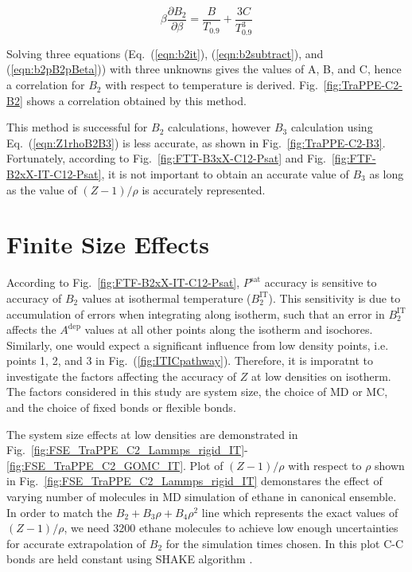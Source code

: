 \documentclass[5p,times]{elsarticle}
\begin{document}
\begin{equation}
\beta \frac{\partial B_2}{\partial \beta}=\frac{B}{T_{0.9}}+\frac{3C}{T_{0.9}^3} \label{eqn:b2pB2pBeta}
\end{equation}

Solving three equations (Eq.~(\ref{eqn:b2it}), (\ref{eqn:b2subtract}), and (\ref{eqn:b2pB2pBeta})) with three unknowns gives the values of A, B, and C, hence a correlation for $B_2$ with respect to temperature is derived. Fig.~\ref{fig:TraPPE-C2-B2} shows a correlation obtained by this method. 

This method is successful for $B_2$ calculations, however $B_3$ calculation using Eq.~(\ref{eqn:Z1rhoB2B3}) is less accurate, as shown in Fig.~\ref{fig:TraPPE-C2-B3}. Fortunately, according to Fig.~\ref{fig:FTT-B3xX-C12-Psat} and Fig.~\ref{fig:FTF-B2xX-IT-C12-Psat}, it is not important to obtain an accurate value of $B_3$ as long as the value of $(Z-1)/\rho$ is accurately represented.

\section{Finite Size Effects}\label{sec:FSE}
According to Fig.~\ref{fig:FTF-B2xX-IT-C12-Psat}, $P^{\mathrm{sat}}$ accuracy is sensitive to accuracy of $B_2$ values at isothermal temperature ($B_2^{\mathrm{IT}}$). This sensitivity is due to accumulation of errors when integrating along isotherm, such that an error in $B_2^{\mathrm{IT}}$ affects the $A^{\mathrm{dep}}$ values at all other points along the isotherm and isochores. Similarly, one would expect a significant influence from low density points, i.e. points 1, 2, and 3 in Fig.~(\ref{fig:ITICpathway}). Therefore, it is imporatnt to investigate the factors affecting the accuracy of $Z$ at low densities on isotherm. The factors considered in this study are system size, the choice of MD or MC, and the choice of fixed bonds or flexible bonds. 

The system size effects at low densities are demonstrated in Fig.~\ref{fig:FSE_TraPPE_C2_Lammps_rigid_IT}-\ref{fig:FSE_TraPPE_C2_GOMC_IT}. Plot of $(Z-1)/\rho$ with respect to $\rho$ shown in Fig.~\ref{fig:FSE_TraPPE_C2_Lammps_rigid_IT} demonstares the effect of varying number of molecules in MD simulation of ethane in canonical ensemble. In order to match the $B_2+B_3 \rho+B_4 \rho^2$ line which represents the exact values of $(Z-1)/\rho$, we need 3200 ethane molecules to achieve low enough uncertainties for accurate extrapolation of $B_2$ for the simulation times chosen. In this plot C-C bonds are held constant using SHAKE algorithm \cite{Ryckaert1977}. 
\end{document}
